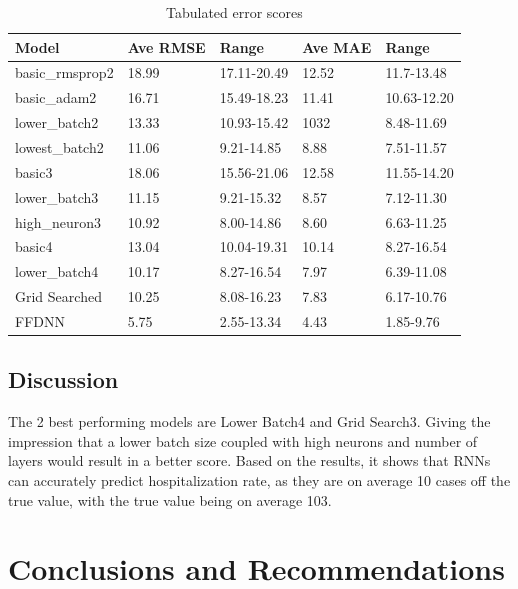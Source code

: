 \documentclass[10pt,11pt,12pt,oneside]{book}
\begin{document}
\begin{table}[H]
\centering
\begin{tabular}{|l|l|l|l|l|}
\toprule
Model & Ave RMSE & Range & Ave MAE & Range \\
\hline
basic\_rmsprop2  & 18.99 & 17.11-20.49 & 12.52 & 11.7-13.48 \\
\hline
basic\_adam2  & 16.71 & 15.49-18.23 & 11.41 & 10.63-12.20 \\
\hline
lower\_batch2 & 13.33 & 10.93-15.42 & 1032 & 8.48-11.69  \\
\hline
lowest\_batch2 & 11.06 & 9.21-14.85 & 8.88 & 7.51-11.57 \\
\hline
basic3 & 18.06 & 15.56-21.06 & 12.58 & 11.55-14.20 \\
\hline
lower\_batch3 & 11.15 & 9.21-15.32 & 8.57 & 7.12-11.30 \\
\hline
high\_neuron3 & 10.92 & 8.00-14.86 & 8.60 & 6.63-11.25 \\
\hline
basic4 & 13.04 & 10.04-19.31 & 10.14 & 8.27-16.54 \\
\hline
lower\_batch4 & 10.17 & 8.27-16.54 & 7.97 & 6.39-11.08 \\
\hline
Grid Searched & 10.25 & 8.08-16.23 & 7.83 & 6.17-10.76 \\
\hline
FFDNN & 5.75 & 2.55-13.34 & 4.43 & 1.85-9.76 \\
\bottomrule
\end{tabular}
\caption{Tabulated error scores}
\label{table:results}
\end{table}

\section{Discussion}
    The 2 best performing models are Lower Batch4 and Grid Search3. Giving the impression that a lower batch size coupled with high neurons and number of layers would result in a better score. Based on the results, it shows that RNNs can accurately predict hospitalization rate, as they are on average 10 cases off the true value, with the true value being on average 103.
\chapter{Conclusions and Recommendations}
\end{document}
